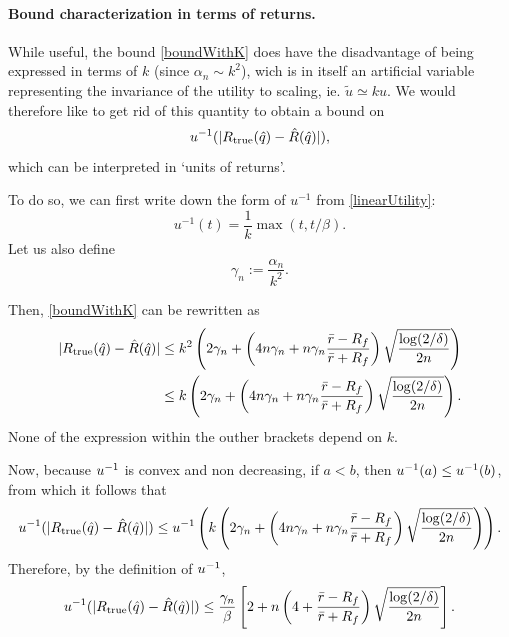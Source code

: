 \paragraph{Bound characterization in terms of returns.}
While useful, the bound \eqref{boundWithK} does have the disadvantage of being expressed
in terms of $k$ (since $\alpha_n \sim k^2$), wich is in itself an artificial variable
representing the invariance of the utility to scaling, ie. $\tilde u \simeq k u$. We would
therefore like to get rid of this quantity to obtain a bound on
\begin{equation*}
  u^{-1}(|R_{\mathrm{true}}(\hat q) - \hat R(\hat q)|),
\end{equation*}
which can be interpreted in `units of returns'. 


To do so, we can first write down the form of $u^{-1}$ from \eqref{linearUtility}:
\begin{equation*}
  u^{-1}(t) = \frac{1}{k}\max(t,t/\beta).
\end{equation*}
Let us also define 
\begin{equation*}
  \gamma_n := \frac{\alpha_n}{k^2}. 
\end{equation*}

Then, \eqref{boundWithK} can be rewritten as
\begin{align}
  |R_{\mathrm{true}}(\hat{q}) - \hat{R}(\hat{q})| &\leq k^2\left(
  2\gamma_n + \left(4n\gamma_n + n\gamma_n\frac{\bar r - R_f}{\bar r +
      R_f}\right) \sqrt{\frac{\log(2/\delta)}{2n}}\right) \nonumber \\
  \label{newKBound}
  &\leq k\left(
  2\gamma_n + \left(4n\gamma_n + n\gamma_n\frac{\bar r - R_f}{\bar r +
      R_f}\right) \sqrt{\frac{\log(2/\delta)}{2n}}\right).
\end{align}
None of the expression within the outher brackets depend on $k$. 

Now, because $u^{-1}$ is convex and non decreasing, if $a<b$, then $u^{-1}(a)\leq u^{-1}(b)$,
from which it follows that
\begin{equation*}
  u^{-1}(|R_{\mathrm{true}}(\hat{q}) - \hat{R}(\hat{q})|) \leq u^{-1}\left(k\left(
  2\gamma_n + \left(4n\gamma_n + n\gamma_n\frac{\bar r - R_f}{\bar r +
      R_f}\right) \sqrt{\frac{\log(2/\delta)}{2n}}\right)\right).
\end{equation*}
Therefore, by the definition of $u^{-1}$, 
\begin{equation*}
  u^{-1}(|R_{\mathrm{true}}(\hat{q}) - \hat{R}(\hat{q})|) \leq 
  \frac{\gamma_n}{\beta}\left[2+ n\left(4 + \frac{\bar r - R_f}{\bar r +
      R_f}\right) \sqrt{\frac{\log(2/\delta)}{2n}}\right].
\end{equation*}

